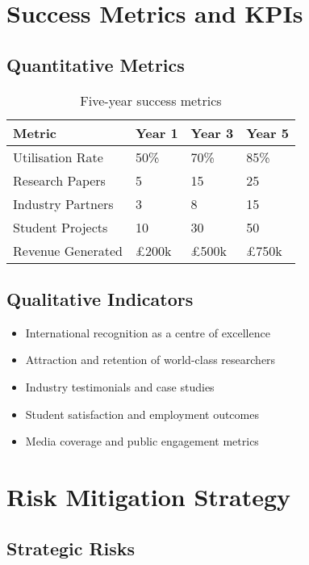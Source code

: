 \section{Success Metrics and KPIs}

\subsection{Quantitative Metrics}

\begin{table}[H]
\centering
\begin{tabular}{@{}llll@{}}
\toprule
\textbf{Metric} & \textbf{Year 1} & \textbf{Year 3} & \textbf{Year 5} \\
\midrule
Utilisation Rate & 50\% & 70\% & 85\% \\
Research Papers & 5 & 15 & 25 \\
Industry Partners & 3 & 8 & 15 \\
Student Projects & 10 & 30 & 50 \\
Revenue Generated & £200k & £500k & £750k \\
\bottomrule
\end{tabular}
\caption{Five-year success metrics}
\end{table}

\subsection{Qualitative Indicators}

\begin{itemize}
    \item International recognition as a centre of excellence
    \item Attraction and retention of world-class researchers
    \item Industry testimonials and case studies
    \item Student satisfaction and employment outcomes
    \item Media coverage and public engagement metrics
\end{itemize}

\section{Risk Mitigation Strategy}

\subsection{Strategic Risks}

